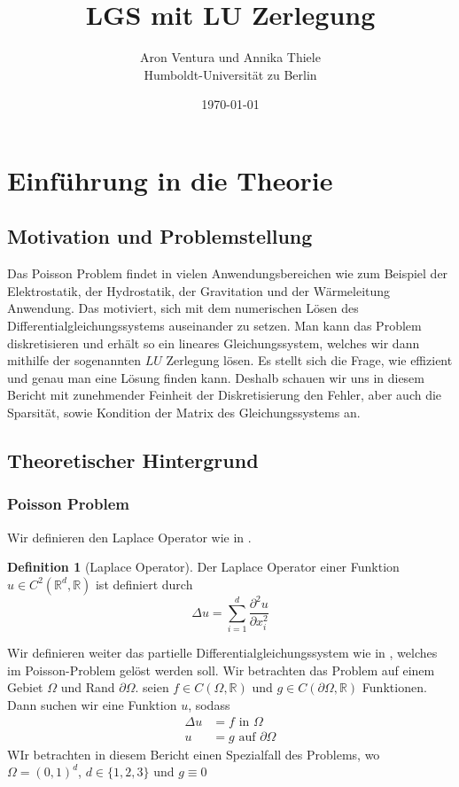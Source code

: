 \documentclass[smallheadings]{scrartcl}
\title{LGS mit LU Zerlegung}
\author{%
 Aron Ventura und Annika Thiele\\ Humboldt-Universit\"at zu Berlin
}
\date{\today}
\theoremstyle{definition}
\newtheorem{definition}{Definition}[section]
\begin{document}
\maketitle
\newpage
\tableofcontents
\newpage


\section{Einf\"uhrung in die Theorie}
	\subsection{Motivation und Problemstellung}
Das Poisson Problem findet in vielen Anwendungsbereichen wie zum Beispiel der Elektrostatik, der Hydrostatik, der Gravitation und der Wärmeleitung Anwendung.
	 	Das motiviert, sich mit dem numerischen Lösen des Differentialgleichungssystems auseinander zu setzen. Man kann das Problem diskretisieren und erhält so ein lineares Gleichungssystem, welches wir dann mithilfe der sogenannten $LU$ Zerlegung lösen. Es stellt sich die Frage, wie effizient und genau man eine Lösung finden kann. Deshalb schauen wir uns in diesem Bericht mit zunehmender Feinheit der Diskretisierung den Fehler, aber auch die Sparsität, sowie Kondition der Matrix des Gleichungssystems an. 


	\subsection{Theoretischer Hintergrund}
		\subsubsection{Poisson Problem}
		Wir definieren den Laplace Operator wie in \citep{PDE}.
		\begin{definition}[Laplace Operator]
		Der Laplace Operator einer Funktion $u\in C^2(\mathbb{R}^d,\mathbb{R})$ ist definiert durch
		$$\Delta u=\sum_{i=1}^d\frac{\partial ^2 u}{\partial x_i^2}$$

		\end{definition}
		Wir definieren weiter das partielle Differentialgleichungssystem wie in \citep{PDE}, welches im Poisson-Problem gelöst werden soll. Wir betrachten das Problem auf einem  Gebiet  $\Omega$ und Rand $\partial \Omega$. seien $f\in C(\Omega , \mathbb{R})$ und $g\in C(\partial \Omega , \mathbb{R})$ Funktionen. Dann suchen wir eine Funktion $u$, sodass
		\begin{align*}
		\Delta u&=f \text{ in }\Omega\\
		u&= g \text{ auf }\partial\Omega
		\end{align*}
		WIr betrachten in diesem Bericht einen Spezialfall des Problems, wo $\Omega =(0,1)^d$, $d\in \{1,2,3\}$ und $g\equiv 0$
\end{document}

